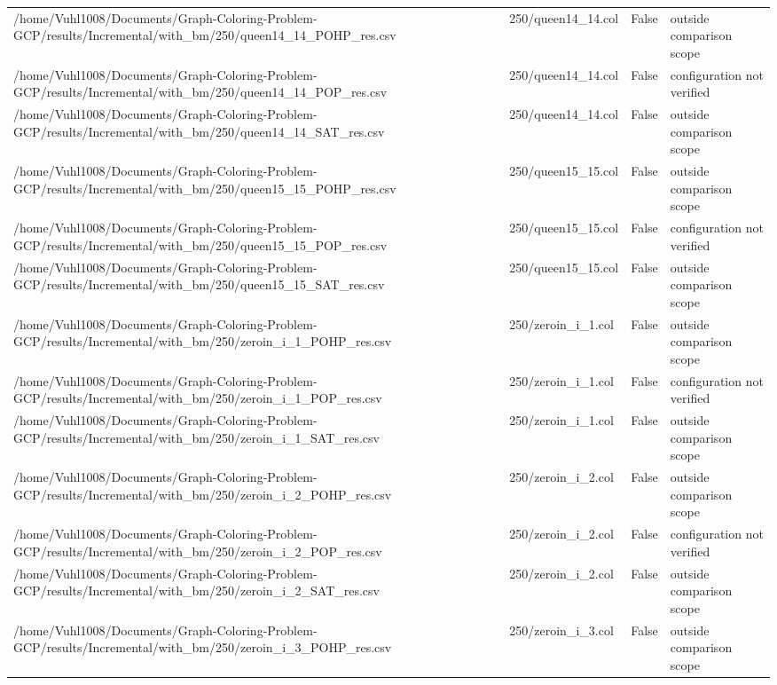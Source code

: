 \begin{table}[htbp]
\begin{tabular}{llll}
/home/Vuhl1008/Documents/Graph-Coloring-Problem-GCP/results/Incremental/with\_bm/250/queen14\_14\_POHP\_res.csv & 250/queen14\_14.col & False & outside comparison scope \\
/home/Vuhl1008/Documents/Graph-Coloring-Problem-GCP/results/Incremental/with\_bm/250/queen14\_14\_POP\_res.csv & 250/queen14\_14.col & False & configuration not verified \\
/home/Vuhl1008/Documents/Graph-Coloring-Problem-GCP/results/Incremental/with\_bm/250/queen14\_14\_SAT\_res.csv & 250/queen14\_14.col & False & outside comparison scope \\
/home/Vuhl1008/Documents/Graph-Coloring-Problem-GCP/results/Incremental/with\_bm/250/queen15\_15\_POHP\_res.csv & 250/queen15\_15.col & False & outside comparison scope \\
/home/Vuhl1008/Documents/Graph-Coloring-Problem-GCP/results/Incremental/with\_bm/250/queen15\_15\_POP\_res.csv & 250/queen15\_15.col & False & configuration not verified \\
/home/Vuhl1008/Documents/Graph-Coloring-Problem-GCP/results/Incremental/with\_bm/250/queen15\_15\_SAT\_res.csv & 250/queen15\_15.col & False & outside comparison scope \\
/home/Vuhl1008/Documents/Graph-Coloring-Problem-GCP/results/Incremental/with\_bm/250/zeroin\_i\_1\_POHP\_res.csv & 250/zeroin\_i\_1.col & False & outside comparison scope \\
/home/Vuhl1008/Documents/Graph-Coloring-Problem-GCP/results/Incremental/with\_bm/250/zeroin\_i\_1\_POP\_res.csv & 250/zeroin\_i\_1.col & False & configuration not verified \\
/home/Vuhl1008/Documents/Graph-Coloring-Problem-GCP/results/Incremental/with\_bm/250/zeroin\_i\_1\_SAT\_res.csv & 250/zeroin\_i\_1.col & False & outside comparison scope \\
/home/Vuhl1008/Documents/Graph-Coloring-Problem-GCP/results/Incremental/with\_bm/250/zeroin\_i\_2\_POHP\_res.csv & 250/zeroin\_i\_2.col & False & outside comparison scope \\
/home/Vuhl1008/Documents/Graph-Coloring-Problem-GCP/results/Incremental/with\_bm/250/zeroin\_i\_2\_POP\_res.csv & 250/zeroin\_i\_2.col & False & configuration not verified \\
/home/Vuhl1008/Documents/Graph-Coloring-Problem-GCP/results/Incremental/with\_bm/250/zeroin\_i\_2\_SAT\_res.csv & 250/zeroin\_i\_2.col & False & outside comparison scope \\
/home/Vuhl1008/Documents/Graph-Coloring-Problem-GCP/results/Incremental/with\_bm/250/zeroin\_i\_3\_POHP\_res.csv & 250/zeroin\_i\_3.col & False & outside comparison scope \\

\end{tabular}
\end{table}
